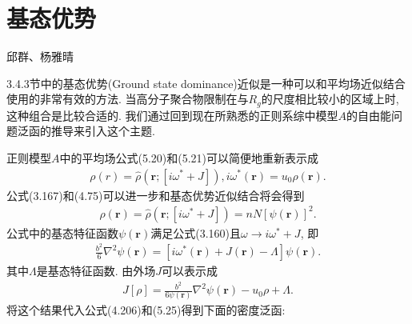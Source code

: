     \section{基态优势}
{\color{red}\begin{center}
    邱群、杨雅晴
    \end{center}}

    3.4.3节中的基态优势(Ground state dominance)近似是一种可以和平均场近似结合使用的非常有效的方法.
    当高分子聚合物限制在与$R_{g}$的尺度相比较小的区域上时,
    这种组合是比较合适的.
    我们通过回到现在所熟悉的正则系综中模型$A$的自由能问题泛函的推导来引入这个主题.
    \par
    正则模型$A$中的平均场公式(5.20)和(5.21)可以简便地重新表示成
    \label{subsec.equations}
    \begin{equation}
        \begin{aligned}
        \rho(r)=\hat{\rho}(\bm{r};[i\omega^{*}+J]),
            i\omega^{*}(\bm{r})=u_{0}\rho(\bm{r}). 
                   \end{aligned}
        \label{eq5.51}
    \end{equation}
    公式(3.167)和(4.75)可以进一步和基态优势近似结合将会得到
    \label{subsec.equations}
    \begin{equation}
        \begin{aligned}
            \rho(\bm{r})=\hat{\rho}(\bm{r};[i\omega^{*}+J])=nN[\psi(\bm{r})]^{2}.
                   \end{aligned}
        \label{eq5.52}
    \end{equation}
    公式中的基态特征函数$\psi(\bm{r})$满足公式(3.160)且$\omega\longrightarrow
    i\omega^{*}+J$, 即
    \label{subsec.equations}
    \begin{equation}
        \begin{aligned}
            \frac{b^2}{6}\nabla^{2}\psi(\bm{r})=[i\omega^{*}(\bm{r})+J(\bm{r})-\Lambda]\psi(\bm{r}).
                   \end{aligned}
        \label{eq5.53}
    \end{equation}
其中$\Lambda$是基态特征函数. 由外场$J$可以表示成
    \label{subsec.equations}
    \begin{equation}
        \begin{aligned}
            J[\rho]=\frac{b^{2}}{6\psi(\bm{r})}\nabla^{2}\psi(\bm{r})-u_{0}\rho+\Lambda.
                   \end{aligned}
        \label{eq5.54}
    \end{equation}
将这个结果代入公式(4.206)和(5.25)得到下面的密度泛函:
